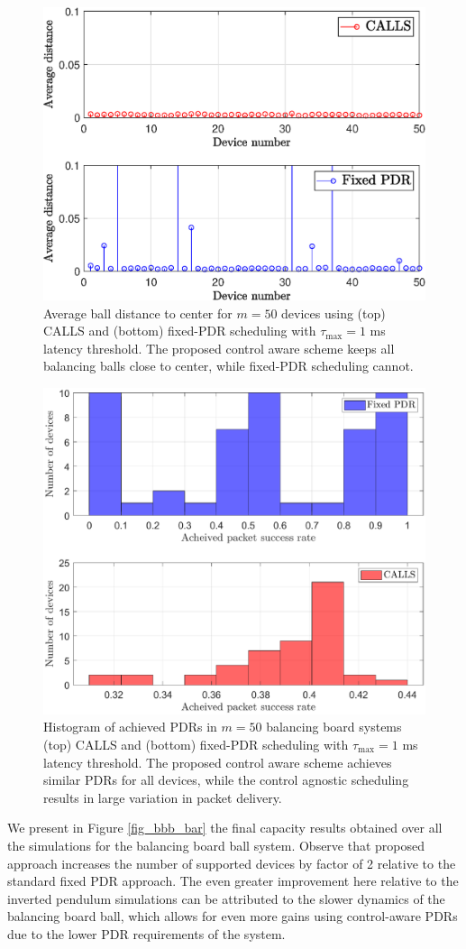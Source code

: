 \begin{figure}
\centering
\includegraphics[width=.45\textwidth]{../images/bbb_dist.eps}
\caption{Average ball distance to center for $m=50$ devices using (top) CALLS and (bottom) fixed-PDR scheduling with $\tau_{\max} =1$ ms latency threshold. The proposed control aware scheme keeps all balancing balls close to center, while fixed-PDR scheduling cannot.}
\label{fig_bbb_dist}
\end{figure}

\begin{figure}
\centering
\includegraphics[width=.45\textwidth]{../images/bbb_psr.eps}
\caption{Histogram of achieved PDRs in $m=50$ balancing board systems (top) CALLS and (bottom) fixed-PDR scheduling with $\tau_{\max} =1$ ms latency threshold. The proposed control aware scheme achieves similar PDRs for all devices, while the control agnostic scheduling results in large variation in packet delivery.}
\label{fig_bbb_psr}
\end{figure}

We present in Figure \ref{fig_bbb_bar} the final capacity results obtained over all the simulations for the balancing board ball system. Observe that proposed approach increases the number of supported devices by factor of 2 relative to the standard fixed PDR approach. The even greater improvement here relative to the inverted pendulum simulations can be attributed to the slower dynamics of the balancing board ball, which allows for even more gains using control-aware PDRs due to the lower PDR requirements of the system.


